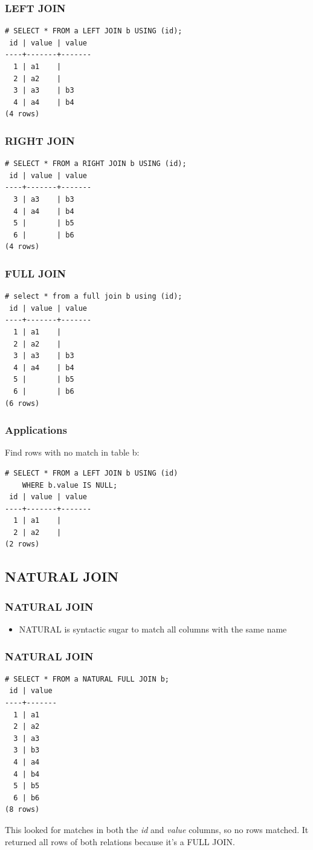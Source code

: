\documentclass{beamer}
\begin{document}
\begin{frame}[fragile]
    \frametitle{LEFT JOIN}
    \begin{verbatim}
# SELECT * FROM a LEFT JOIN b USING (id);
 id | value | value
----+-------+-------
  1 | a1    |
  2 | a2    |
  3 | a3    | b3
  4 | a4    | b4
(4 rows)
    \end{verbatim}
\end{frame}

\begin{frame}[fragile]
    \frametitle{RIGHT JOIN}
    \begin{verbatim}
# SELECT * FROM a RIGHT JOIN b USING (id);
 id | value | value
----+-------+-------
  3 | a3    | b3
  4 | a4    | b4
  5 |       | b5
  6 |       | b6
(4 rows)
    \end{verbatim}
\end{frame}

\begin{frame}[fragile]
    \frametitle{FULL JOIN}
    \begin{verbatim}
# select * from a full join b using (id);
 id | value | value
----+-------+-------
  1 | a1    |
  2 | a2    |
  3 | a3    | b3
  4 | a4    | b4
  5 |       | b5
  6 |       | b6
(6 rows)
    \end{verbatim}
\end{frame}

\begin{frame}[fragile]
    \frametitle{Applications}
    Find rows with no match in table b: \\
    \begin{verbatim}
# SELECT * FROM a LEFT JOIN b USING (id)
    WHERE b.value IS NULL;
 id | value | value
----+-------+-------
  1 | a1    |
  2 | a2    |
(2 rows)
    \end{verbatim}
\end{frame}

\subsection{NATURAL JOIN}
\begin{frame}
    \frametitle{NATURAL JOIN}
    \begin{itemize}
        \item NATURAL is syntactic sugar to match all columns with the same name
    \end{itemize}
\end{frame}

\begin{frame}[fragile]
    \frametitle{NATURAL JOIN}
    \begin{verbatim}
# SELECT * FROM a NATURAL FULL JOIN b;
 id | value
----+-------
  1 | a1
  2 | a2
  3 | a3
  3 | b3
  4 | a4
  4 | b4
  5 | b5
  6 | b6
(8 rows)
    \end{verbatim}
    This looked for matches in both the \emph{id} and \emph{value} columns, so no rows matched. It returned all rows of both relations because it's a FULL JOIN.
\end{frame}
\end{document}
